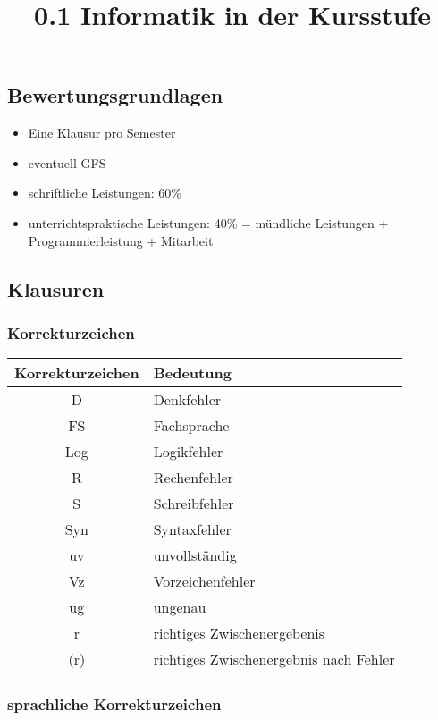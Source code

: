 \documentclass[
  11pt,
  a4paper,
  DIV=11,
  numbers=noendperiod]{scrartcl}
\title{0.1 Informatik in der Kursstufe}
\author{}
\date{}
\providecommand{\tightlist}{%
  \setlength{\itemsep}{0pt}\setlength{\parskip}{0pt}}\usepackage{longtable,booktabs,array}
\begin{document}
\maketitle


\subsection{Bewertungsgrundlagen}\label{bewertungsgrundlagen}

\begin{itemize}
\tightlist
\item
  Eine Klausur pro Semester
\item
  eventuell GFS
\item
  schriftliche Leistungen: 60\%
\item
  unterrichtspraktische Leistungen: 40\% = mündliche Leistungen +
  Programmierleistung + Mitarbeit
\end{itemize}

\subsection{Klausuren}\label{klausuren}

\subsubsection{Korrekturzeichen}\label{korrekturzeichen}

\begin{longtable}[]{@{}cl@{}}
\toprule\noalign{}
Korrekturzeichen & Bedeutung \\
\midrule\noalign{}
\endhead
\bottomrule\noalign{}
\endlastfoot
D & Denkfehler \\
FS & Fachsprache \\
Log & Logikfehler \\
R & Rechenfehler \\
S & Schreibfehler \\
Syn & Syntaxfehler \\
uv & unvollständig \\
Vz & Vorzeichenfehler \\
ug & ungenau \\
r & richtiges Zwischenergebenis \\
(r) & richtiges Zwischenergebnis nach Fehler \\
\end{longtable}

\subsubsection{sprachliche
Korrekturzeichen}\label{sprachliche-korrekturzeichen}
\end{document}
